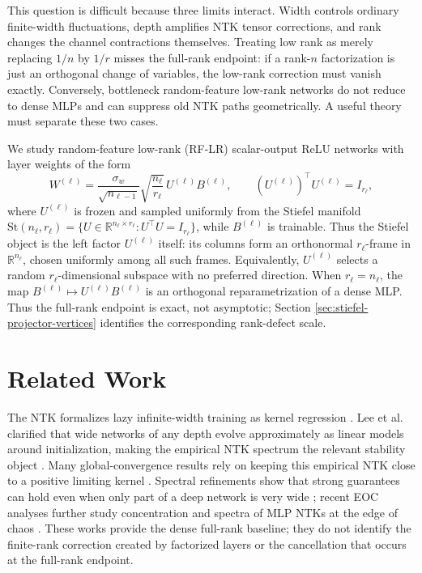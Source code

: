 \documentclass{article}
\newcommand{\R}{\mathbb R}
\begin{document}
This question is difficult because three limits interact. Width controls ordinary finite-width fluctuations, depth amplifies NTK tensor corrections, and rank changes the channel contractions themselves. Treating low rank as merely replacing \(1/n\) by \(1/r\) misses the full-rank endpoint: if a rank-\(n\) factorization is just an orthogonal change of variables, the low-rank correction must vanish exactly. Conversely, bottleneck random-feature low-rank networks do not reduce to dense MLPs and can suppress old NTK paths geometrically. A useful theory must separate these two cases.

We study random-feature low-rank (RF-LR) scalar-output ReLU networks with layer weights of the form
\begin{equation}
W^{(\ell)}=\frac{\sigma_w}{\sqrt{n_{\ell-1}}}\sqrt{\frac{n_\ell}{r_\ell}}\,U^{(\ell)}B^{(\ell)},
\qquad (U^{(\ell)})^\top U^{(\ell)}=I_{r_\ell},
\label{eq:intro-model}
\end{equation}
where \(U^{(\ell)}\) is frozen and sampled uniformly from the Stiefel manifold
\(\mathrm{St}(n_\ell,r_\ell)=\{U\in\R^{n_\ell\times r_\ell}:U^\top U=I_{r_\ell}\}\), while \(B^{(\ell)}\) is trainable. Thus the Stiefel object is the left factor \(U^{(\ell)}\) itself: its columns form an orthonormal \(r_\ell\)-frame in \(\R^{n_\ell}\), chosen uniformly among all such frames. Equivalently, \(U^{(\ell)}\) selects a random \(r_\ell\)-dimensional subspace with no preferred direction. When \(r_\ell=n_\ell\), the map \(B^{(\ell)}\mapsto U^{(\ell)}B^{(\ell)}\) is an orthogonal reparametrization of a dense MLP. Thus the full-rank endpoint is exact, not asymptotic; Section \ref{sec:stiefel-projector-vertices} identifies the corresponding rank-defect scale.

\section{Related Work}
The NTK formalizes lazy infinite-width training as kernel regression \citep{Jacot2018,Lee2019}. Lee et al. clarified that wide networks of any depth evolve approximately as linear models around initialization, making the empirical NTK spectrum the relevant stability object \citep{Lee2019}. Many global-convergence results rely on keeping this empirical NTK close to a positive limiting kernel \citep{Du2019,AllenZhu2019,Arora2019}. Spectral refinements show that strong guarantees can hold even when only part of a deep network is very wide \citep{NguyenMondelli2020,NguyenMondelliMontufar2022}; recent EOC analyses further study concentration and spectra of MLP NTKs at the edge of chaos \citep{TerjekGonzalezSanchez2025Concentration,TerjekGonzalezSanchez2025Spectrum}. These works provide the dense full-rank baseline; they do not identify the finite-rank correction created by factorized layers or the cancellation that occurs at the full-rank endpoint.
\end{document}
